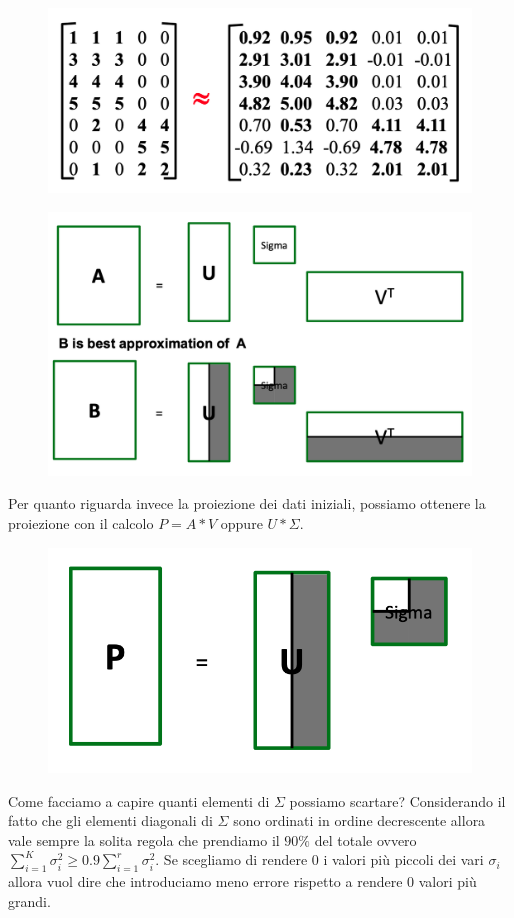 \documentclass[14pt]{extreport}
\begin{document}
\begin{figure}[H] 
\centering
\includegraphics[width=0.7\linewidth]{507.jpeg}
\end{figure}


\begin{figure}[H] 
\centering
\includegraphics[width=0.7\linewidth]{508.jpeg}
\end{figure}

Per quanto riguarda invece la proiezione dei dati iniziali, possiamo ottenere la proiezione con il calcolo $P=A*V$ oppure $U*\Sigma$.

\begin{figure}[H] 
\centering
\includegraphics[width=0.7\linewidth]{509.jpeg}
\end{figure}

Come facciamo a capire quanti elementi di $\Sigma$ possiamo scartare? 
Considerando il fatto che gli elementi diagonali di $\Sigma$ sono ordinati in ordine decrescente allora vale sempre la solita regola che prendiamo il $90\%$
del totale ovvero $\sum_{i=1}^K \sigma_i^2 \geq 0.9 \sum_{i=1}^r \sigma_i^2$.
Se scegliamo di rendere 0 i valori più piccoli dei vari $\sigma_i$ allora vuol dire che introduciamo meno errore rispetto a rendere 0 valori più grandi.
\end{document}
